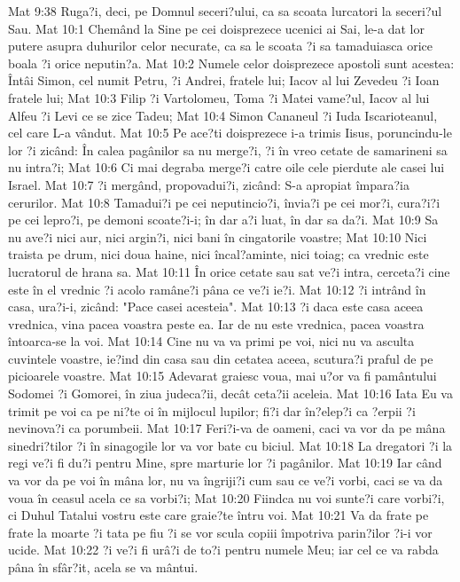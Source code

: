 Mat 9:38  Ruga?i, deci, pe Domnul seceri?ului, ca sa scoata lurcatori la seceri?ul Sau.
Mat 10:1  Chemând la Sine pe cei doisprezece ucenici ai Sai, le-a dat lor putere asupra duhurilor celor necurate, ca sa le scoata ?i sa tamaduiasca orice boala ?i orice neputin?a.
Mat 10:2  Numele celor doisprezece apostoli sunt acestea: Întâi Simon, cel numit Petru, ?i Andrei, fratele lui; Iacov al lui Zevedeu ?i Ioan fratele lui;
Mat 10:3  Filip ?i Vartolomeu, Toma ?i Matei vame?ul, Iacov al lui Alfeu ?i Levi ce se zice Tadeu;
Mat 10:4  Simon Cananeul ?i Iuda Iscarioteanul, cel care L-a vândut.
Mat 10:5  Pe ace?ti doisprezece i-a trimis Iisus, poruncindu-le lor ?i zicând: În calea pagânilor sa nu merge?i, ?i în vreo cetate de samarineni sa nu intra?i;
Mat 10:6  Ci mai degraba merge?i catre oile cele pierdute ale casei lui Israel.
Mat 10:7  ?i mergând, propovadui?i, zicând: S-a apropiat împara?ia cerurilor.
Mat 10:8  Tamadui?i pe cei neputincio?i, învia?i pe cei mor?i, cura?i?i pe cei lepro?i, pe demoni scoate?i-i; în dar a?i luat, în dar sa da?i.
Mat 10:9  Sa nu ave?i nici aur, nici argin?i, nici bani în cingatorile voastre;
Mat 10:10  Nici traista pe drum, nici doua haine, nici încal?aminte, nici toiag; ca vrednic este lucratorul de hrana sa.
Mat 10:11  În orice cetate sau sat ve?i intra, cerceta?i cine este în el vrednic ?i acolo ramâne?i pâna ce ve?i ie?i.
Mat 10:12  ?i intrând în casa, ura?i-i, zicând: "Pace casei acesteia".
Mat 10:13  ?i daca este casa aceea vrednica, vina pacea voastra peste ea. Iar de nu este vrednica, pacea voastra întoarca-se la voi.
Mat 10:14  Cine nu va va primi pe voi, nici nu va asculta cuvintele voastre, ie?ind din casa sau din cetatea aceea, scutura?i praful de pe picioarele voastre.
Mat 10:15  Adevarat graiesc voua, mai u?or va fi pamântului Sodomei ?i Gomorei, în ziua judeca?ii, decât ceta?ii aceleia.
Mat 10:16  Iata Eu va trimit pe voi ca pe ni?te oi în mijlocul lupilor; fi?i dar în?elep?i ca ?erpii ?i nevinova?i ca porumbeii.
Mat 10:17  Feri?i-va de oameni, caci va vor da pe mâna sinedri?tilor ?i în sinagogile lor va vor bate cu biciul.
Mat 10:18  La dregatori ?i la regi ve?i fi du?i pentru Mine, spre marturie lor ?i pagânilor.
Mat 10:19  Iar când va vor da pe voi în mâna lor, nu va îngriji?i cum sau ce ve?i vorbi, caci se va da voua în ceasul acela ce sa vorbi?i;
Mat 10:20  Fiindca nu voi sunte?i care vorbi?i, ci Duhul Tatalui vostru este care graie?te întru voi.
Mat 10:21  Va da frate pe frate la moarte ?i tata pe fiu ?i se vor scula copiii împotriva parin?ilor ?i-i vor ucide.
Mat 10:22  ?i ve?i fi urâ?i de to?i pentru numele Meu; iar cel ce va rabda pâna în sfâr?it, acela se va mântui.
